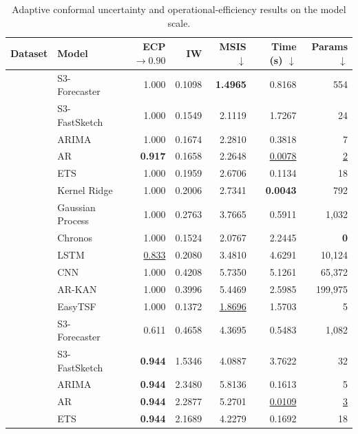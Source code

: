 \begin{table}[p]
\centering
\caption{Adaptive conformal uncertainty and operational-efficiency results on the model scale.}
\label{tab:uq_performance_vertical}
\label{tab:efficiency_vertical}
\scriptsize
\setlength{\tabcolsep}{1.5pt}
\renewcommand{\arraystretch}{0.52}
\begin{tabular}{|>{\centering\arraybackslash}p{1.15cm}|>{\raggedright\arraybackslash}p{2.25cm}|r|r|r|r|r|}
\hline
Dataset & Model & ECP $\rightarrow 0.90$ & IW & MSIS $\downarrow$ & Time (s) $\downarrow$ & Params $\downarrow$ \\
\hline
\multirow{12}{=}{\centering CIF} & S3-Forecaster & 1.000 & 0.1098 & \textbf{1.4965} & 0.8168 & 554 \\
\cline{2-7}
 & S3-FastSketch & 1.000 & 0.1549 & 2.1119 & 1.7267 & 24 \\
\cline{2-7}
 & ARIMA & 1.000 & 0.1674 & 2.2810 & 0.3818 & 7 \\
\cline{2-7}
 & AR & \textbf{0.917} & 0.1658 & 2.2648 & \underline{0.0078} & \underline{2} \\
\cline{2-7}
 & ETS & 1.000 & 0.1959 & 2.6706 & 0.1134 & 18 \\
\cline{2-7}
 & Kernel Ridge & 1.000 & 0.2006 & 2.7341 & \textbf{0.0043} & 792 \\
\cline{2-7}
 & Gaussian Process & 1.000 & 0.2763 & 3.7665 & 0.5911 & 1,032 \\
\cline{2-7}
 & Chronos & 1.000 & 0.1524 & 2.0767 & 2.2445 & \textbf{0} \\
\cline{2-7}
 & LSTM & \underline{0.833} & 0.2080 & 3.4810 & 4.6291 & 10,124 \\
\cline{2-7}
 & CNN & 1.000 & 0.4208 & 5.7350 & 5.1261 & 65,372 \\
\cline{2-7}
 & AR-KAN & 1.000 & 0.3996 & 5.4469 & 2.5985 & 199,975 \\
\cline{2-7}
 & EasyTSF & 1.000 & 0.1372 & \underline{1.8696} & 1.5703 & 5 \\
\hline
\multirow{12}{=}{\centering M3} & S3-Forecaster & 0.611 & 0.4658 & 4.3695 & 0.5483 & 1,082 \\
\cline{2-7}
 & S3-FastSketch & \textbf{0.944} & 1.5346 & 4.0887 & 3.7622 & 32 \\
\cline{2-7}
 & ARIMA & \textbf{0.944} & 2.3480 & 5.8136 & 0.1613 & 5 \\
\cline{2-7}
 & AR & \textbf{0.944} & 2.2877 & 5.2701 & \underline{0.0109} & \underline{3} \\
\cline{2-7}
 & ETS & \textbf{0.944} & 2.1689 & 4.2279 & 0.1692 & 18 \\

\end{tabular}
\end{table}
